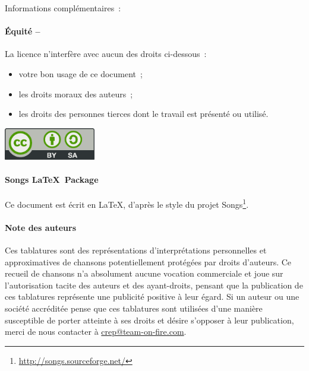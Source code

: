 {\begin{lblock}{Informations complémentaires~:}
{      \paragraph{Équité --}
      La licence n'interfère avec aucun des droits ci-dessous~:
      \begin{itemize}
      \item votre bon usage de ce document~;
      \item les droits moraux des auteurs~;
      \item les droits des personnes tierces dont le travail est
        présenté ou utilisé.
      \end{itemize}
    }

    \begin{center}
      \includegraphics[width=4cm]{img/license}
    \end{center}

  \end{lblock}
  \paragraph{Songs \LaTeX~Package}
  Ce document est écrit en \LaTeX, d'après le style du projet
  Songs\footnote{\url{http://songs.sourceforge.net/}}.

  \paragraph{Note des auteurs}
  Ces tablatures sont des représentations d'interprétations personnelles
  et approximatives de chansons potentiellement protégées par droits
  d'auteurs. Ce recueil de chansons n'a absolument aucune vocation
  commerciale et joue sur l'autorisation tacite des auteurs et des
  ayant-droits, pensant que la publication de ces tablatures représente
  une publicité positive à leur égard. Si un auteur ou une société
  accréditée pense que ces tablatures sont utilisées d'une manière
  susceptible de porter atteinte à ses droits et désire s'opposer à leur
  publication, merci de nous contacter à \url{crep@team-on-fire.com}.
}

